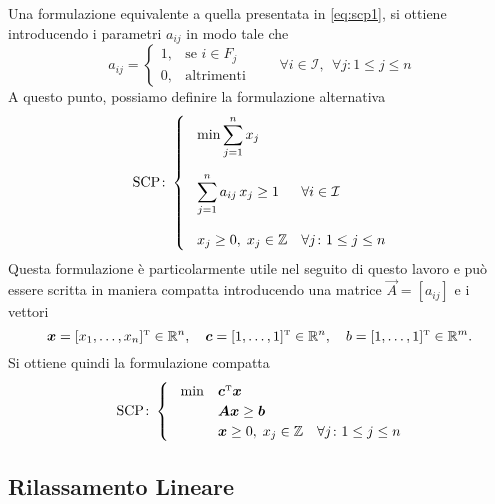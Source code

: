 Una formulazione equivalente a quella presentata in \ref{eq:scp1}, si ottiene introducendo i
parametri \( a_{ij} \) in modo tale che
\begin{equation}
    a_{ij} =
    \begin{cases}
        1, & \text{se } i \in F_j \\
        0, & \text{altrimenti}
    \end{cases} \qquad \forall i \in \mathcal{I} ,\;\,\forall j\colon 1 \leq j \leq n
\end{equation}
A questo punto, possiamo definire la formulazione alternativa
\begin{equation}\label{eq:scp2}
    \text{SCP}\colon
    \begin{cases}
        \hspace*{0.3cm}\min  \displaystyle\sum_{j=1}^{n} x_j \\[20pt]
        \hspace*{0.3cm}\displaystyle\sum_{j=1}^n a_{ij}\,x_j \geq 1 & \forall i \in \mathcal{I} \\[20pt]
        \hspace*{0.3cm}x_j \geq 0,\; x_j \in \mathbb{Z} & \forall j\colon 1 \leq j \leq n
    \end{cases}
\end{equation}
Questa formulazione è particolarmente utile nel seguito di questo lavoro e può essere scritta in maniera compatta
introducendo una matrice \( \vec{A} = [a_{ij}] \) e i vettori
\[
    \bm{x} = [x_1, \ldots, x_n]^{\scriptscriptstyle\mathrm{T}} \in \mathbb{R}^n, \quad \bm{c} = [1, \ldots, 1]^{\scriptscriptstyle\mathrm{T}} \in \mathbb{R}^n
    ,\quad b = [1, \ldots, 1]^{\scriptscriptstyle\mathrm{T}} \in \mathbb{R}^m.
\]
Si ottiene quindi la formulazione compatta
\begin{equation}\label{eq:scp3}
    \text{SCP}\colon
    \begin{cases}
        \hspace*{0.3cm}\min & \bm{c}^{\scriptscriptstyle\mathrm{T}}\bm{x}\\
        \hspace*{0.3cm}&\bm{A}\bm{x} \geq \bm{b} \\
        \hspace*{0.3cm}&\bm{x} \geq 0,\; x_j \in \mathbb{Z} \quad \forall j\colon 1 \leq j \leq n
    \end{cases}
\end{equation}

\subsection{Rilassamento Lineare}


